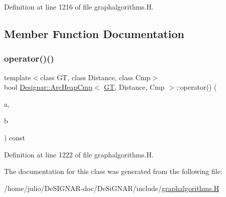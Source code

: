 Definition at line 1216 of file graphalgorithms.\+H.



\subsection{Member Function Documentation}
\mbox{\label{class_designar_1_1_arc_heap_cmp_a9d86fd876bad098a0a6844e9b302f141}} 
\subsubsection{\texorpdfstring{operator()()}{operator()()}}
{\footnotesize\ttfamily template$<$class GT, class Distance, class Cmp$>$ \\
bool \hyperlink{class_designar_1_1_arc_heap_cmp}{Designar\+::\+Arc\+Heap\+Cmp}$<$ \hyperlink{demo-buildgraph_8_c_a3001c40d2c31ca87ed96cd7d1334a55e}{GT}, Distance, Cmp $>$\+::operator() (\begin{DoxyParamCaption}\item[{typename G\+T\+::\+Arc $\ast$}]{a,  }\item[{typename G\+T\+::\+Arc $\ast$}]{b }\end{DoxyParamCaption}) const\hspace{0.3cm}{\ttfamily [inline]}}



Definition at line 1222 of file graphalgorithms.\+H.



The documentation for this class was generated from the following file\+:\begin{DoxyCompactItemize}
\item 
/home/julio/\+De\+S\+I\+G\+N\+A\+R-\/doc/\+De\+Si\+G\+N\+A\+R/include/\hyperlink{graphalgorithms_8_h}{graphalgorithms.\+H}\end{DoxyCompactItemize}
